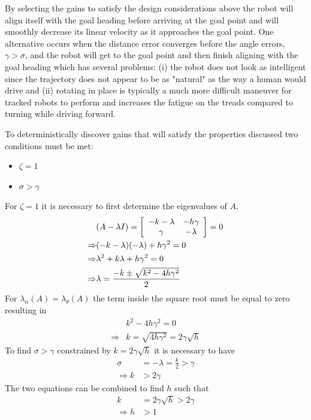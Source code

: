 By selecting the gains to satisfy the design considerations above the robot will align itself with the goal heading before arriving at the goal point and will smoothly decrease its linear velocity as it approaches the goal point. One alternative occurs when the distance error converges before the angle errors, $\gamma>\sigma$, and the robot will get to the goal point and then finish aligning with the goal heading which has several problems: (i) the robot does not look as intelligent since the trajectory does not appear to be as "natural" as the way a human would drive and (ii) rotating in place is typically a much more difficult maneuver for tracked robots to perform and increases the fatigue on the treads compared to turning while driving forward.

To deterministically discover gains that will satisfy the properties discussed two conditions must be met:
\begin{itemize}
\item $\zeta = 1$
\item $\sigma > \gamma$
\end{itemize}
For $\zeta=1$ it is necessary to first determine the eigenvalues of $A$.
\begin{align*}
&(A-\lambda I) = \left[\begin{array}{c c} -k-\lambda & -h\gamma \\ \gamma & -\lambda\end{array}\right] = 0 \\
\Rightarrow &(-k-\lambda)(-\lambda)+h\gamma^2 = 0 \\
\Rightarrow &\lambda^2 + k\lambda + h\gamma^2 = 0 \\
\Rightarrow &\lambda = \frac{-k\pm\sqrt{k^2-4h\gamma^2}}{2}
\end{align*}
For $\lambda_\alpha(A)=\lambda_\theta(A)$ the term inside the square root must be equal to zero resulting in
\begin{align*}
&k^2 - 4h\gamma^2 = 0 \\
\Rightarrow &k = \sqrt{4h\gamma^2} = 2\gamma\sqrt{h}
\end{align*}
To find $\sigma>\gamma$ constrained by $k=2\gamma\sqrt{h}$ it is necessary to have
\begin{align*}
\sigma &= -\lambda = \tfrac{k}{2} > \gamma \\
\Rightarrow k &> 2\gamma
\end{align*}
The two equations can be combined to find $h$ such that
\begin{align*}
k &= 2\gamma\sqrt{h} > 2\gamma \\
\Rightarrow h &> 1
\end{align*}

